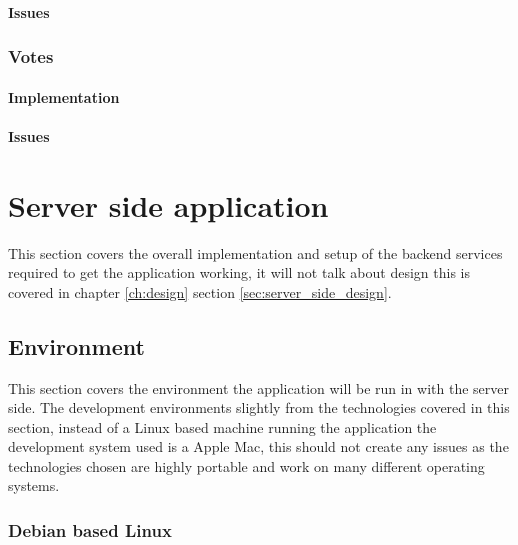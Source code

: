 \paragraph*{Issues}


\subsubsection*{Votes}

\paragraph*{Implementation}

\paragraph*{Issues}



\section{Server side application}

This section covers the overall implementation and setup of the backend services required to get the application working, it will not talk about design this is covered in chapter \ref{ch:design} section \ref{sec:server_side_design}.

\subsection{Environment}

This section covers the environment the application will be run in with the server side. The development environments slightly from the technologies covered in this section, instead of a Linux based machine running the application the development system used is a Apple Mac, this should not create any issues as the technologies chosen are highly portable and work on many different operating systems.

\subsubsection{Debian based Linux}
\label{sec:debian_server}

